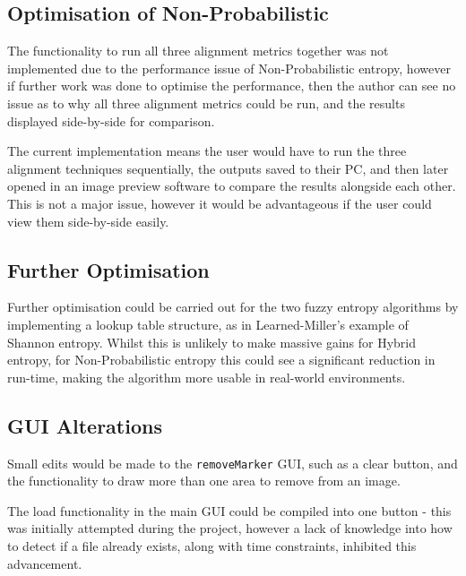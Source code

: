 \subsection{Optimisation of Non-Probabilistic}

The functionality to run all three alignment metrics together was not implemented due to the performance issue of Non-Probabilistic entropy, however if further work was done to optimise the performance, then the author can see no issue as to why all three alignment metrics could be run, and the results displayed side-by-side for comparison.

The current implementation means the user would have to run the three alignment techniques sequentially, the outputs saved to their PC, and then later opened in an image preview software to compare the results alongside each other. This is not a major issue, however it would be advantageous if the user could view them side-by-side easily.

\subsection{Further Optimisation}

Further optimisation could be carried out for the two fuzzy entropy algorithms by implementing a lookup table structure, as in Learned-Miller's example of Shannon entropy. Whilst this is unlikely to make massive gains for Hybrid entropy, for Non-Probabilistic entropy this could see a significant reduction in run-time, making the algorithm more usable in real-world environments.

\subsection{GUI Alterations}

Small edits would be made to the \texttt{removeMarker} \acrshort{GUI}, such as a clear button, and the functionality to draw more than one area to remove from an image.

The load functionality in the main \acrshort{GUI} could be compiled into one button - this was initially attempted during the project, however a lack of knowledge into how to detect if a file already exists, along with time constraints, inhibited this advancement.
